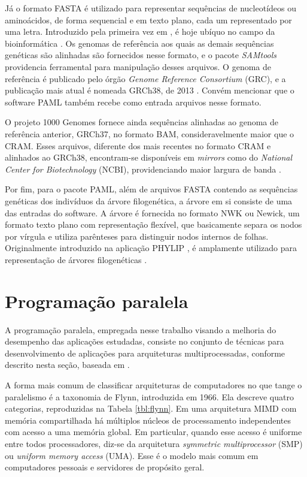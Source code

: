\documentclass[cic,tc]{iiufrgs}
\begin{document}
Já o formato FASTA é utilizado para representar sequências de nucleotídeos ou
aminoácidos, de forma sequencial e em texto plano, cada um representado por uma
letra. Introduzido pela primeira vez em \cite{fasta}, é hoje ubíquo no campo da
bioinformática \cite{shen2016seqkit}.  Os genomas de referência aos quais as
demais sequências genéticas são alinhadas são fornecidos nesse formato, e o
pacote \textit{SAMtools} providencia ferramental para manipulação desses
arquivos. O genoma de referência é publicado pelo órgão \textit{Genome
Reference Consortium} (GRC), e a publicação mais atual é nomeada GRCh38, de
2013 \cite{GUO201783}. Convém mencionar que o software PAML também recebe como
entrada arquivos nesse formato.

O projeto 1000 Genomes fornece ainda sequências alinhadas ao genoma de
referência anterior, GRCh37, no formato BAM, consideravelmente maior que o
CRAM. Esses arquivos, diferente dos mais recentes no formato CRAM e alinhados
ao GRCh38, encontram-se disponíveis em \textit{mirrors} como do
\textit{National Center for Biotechnology} (NCBI), providenciando maior largura
de banda \cite{clarke20121000}.

Por fim, para o pacote PAML, além de arquivos FASTA contendo as sequências
genéticas dos indivíduos da árvore filogenética, a árvore em si consiste de uma
das entradas do software. A árvore é fornecida no formato NWK ou Newick, um
formato texto plano com representação flexível, que basicamente separa os nodos
por vírgula e utiliza parênteses para distinguir nodos internos de folhas.
Originalmente introduzido na aplicação PHYLIP \cite{felsenstein1993phylip}, é
amplamente utilizado para representação de árvores filogenéticas \cite{fredslund2006phy}.

\section{Programação paralela}
\label{sec:par}

A programação paralela, empregada nesse trabalho visando a melhoria do
desempenho das aplicações estudadas, consiste no conjunto de técnicas para
desenvolvimento de aplicações para arquiteturas multiprocessadas, conforme
descrito nesta seção, baseada em \cite{el2005advanced}.

A forma mais comum de classificar arquiteturas de computadores no que tange o
paralelismo é a taxonomia de Flynn, introduzida em 1966. Ela descreve quatro
categorias, reproduzidas na Tabela \ref{tbl:flynn}. Em uma arquitetura MIMD com
memória compartilhada há múltiplos núcleos de processamento independentes com
acesso a uma memória global. Em particular, quando esse acesso é uniforme entre
todos processadores, diz-se da arquitetura \textit{symmetric multiprocessor}
(SMP) ou \textit{uniform memory access} (UMA). Esse é o modelo mais comum em
computadores pessoais e servidores de propósito geral.
\end{document}
